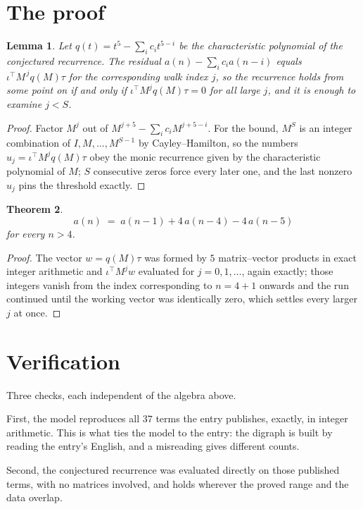 \documentclass[11pt,a4paper]{article}
\theoremstyle{plain}
\newtheorem{theorem}{Theorem}
\newtheorem{lemma}[theorem]{Lemma}
\theoremstyle{definition}
\begin{document}
\section{The proof}

\begin{lemma}\label{lem:crit}
Let $q(t)=t^{5}-\sum_i c_it^{5-i}$ be the characteristic polynomial of the
conjectured recurrence. The residual $a(n)-\sum_ic_ia(n-i)$ equals
$\iota^{\!\top}M^{\,j}q(M)\tau$ for the corresponding walk index $j$, so the recurrence
holds from some point on if and only if $\iota^{\!\top}M^{j}q(M)\tau=0$ for all large $j$,
and it is enough to examine $j<S$.
\end{lemma}

\begin{proof}
Factor $M^{j}$ out of $M^{j+5}-\sum_ic_iM^{j+5-i}$. For the bound, $M^{S}$
is an integer combination of $I,M,\dots,M^{S-1}$ by Cayley--Hamilton, so the numbers
$u_j=\iota^{\!\top}M^{j}q(M)\tau$ obey the monic recurrence given by the characteristic
polynomial of $M$; $S$ consecutive zeros force every later one, and the last nonzero $u_j$
pins the threshold exactly.
\end{proof}

\begin{theorem}
\[
a(n)\;=\;a(n-1) + 4\,a(n-4) - 4\,a(n-5)
\]
for every $n>4$.
\end{theorem}

\begin{proof}
The vector $w=q(M)\tau$ was formed by $5$ matrix--vector products in exact integer
arithmetic and $\iota^{\!\top}M^{j}w$ evaluated for $j=0,1,\dots$, again exactly; those
integers vanish from the index corresponding to $n=4+1$ onwards and the run continued
until the working vector was identically zero, which settles every larger $j$ at once.
\end{proof}

\section{Verification}

Three checks, each independent of the algebra above.

First, the model reproduces all $37$ terms the entry publishes, exactly, in integer
arithmetic. This is what ties the model to the entry: the digraph is built by reading the
entry's English, and a misreading gives different counts.

Second, the conjectured recurrence was evaluated directly on those published terms, with no
matrices involved, and holds wherever the proved range and the data overlap.
\end{document}
